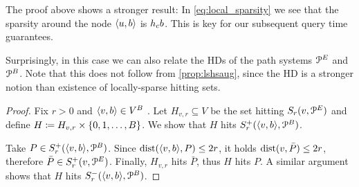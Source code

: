 The proof above shows a stronger result:
In \cref{eq:local_sparsity} we see that the sparsity around the node $\langle u,b\rangle$ is $h_c b$.
This is key for our subsequent query time guarantees.

Surprisingly, in this case we can also relate the HDs of the path systems $\mathcal{P}^E$ and $\mathcal{P}^B$.
Note that this does not follow from \cref{prop:lshsaug}, since the HD is a stronger notion than existence of locally-sparse hitting sets.
\begin{proof}
Fix $r>0$ and $\langle v,b\rangle\in V^B$ .
Let $H_{v,r}\subseteq V$ be the set hitting $S_r(v,\mathcal{P}^E)$ and define $H\coloneqq H_{v,r}\times\{0,1,\ldots,B\}$.
We show that $H$ hits $S^+_r(\langle v,b\rangle,\mathcal{P}^B)$.

Take $P\in S^+_r(\langle v,b\rangle,\mathcal{P}^B)$.
Since $\mbox{dist}(\langle v,b\rangle,P)\leq 2r$, it holds $\mbox{dist}(v,\bar P)\leq 2r$, therefore $\bar P\in S^+_r(v,\mathcal{P}^E)$.
Finally, $H_{v,r}$ hits $\bar P$, thus $H$ hits $P$.
A similar argument shows that $H$ hits $S^-_r(\langle v,b\rangle,\mathcal{P}^B)$.
\end{proof}
